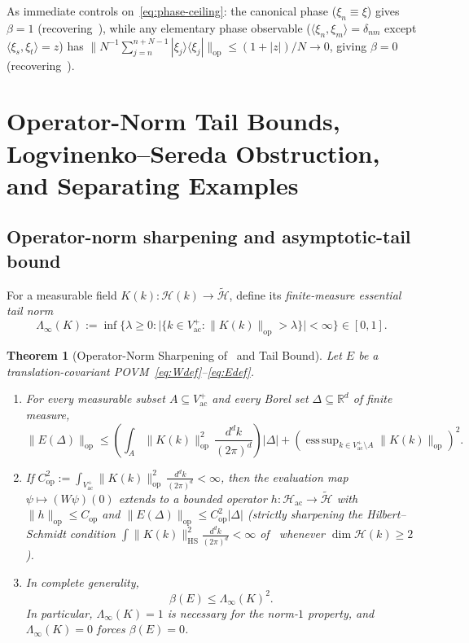 \documentclass[11pt,a4paper]{article}
\newtheorem{theorem}{Theorem}[section]
\theoremstyle{definition}
\theoremstyle{remark}
\newcommand{\HH}{\mathcal{H}}
\newcommand{\tH}{\widetilde{\mathcal{H}}}
\newcommand{\RR}{\mathbb{R}}
\newcommand{\op}{\mathrm{op}}
\newcommand{\HS}{\mathrm{HS}}
\newcommand{\ac}{\mathrm{ac}}
\newcommand{\ket}[1]{|#1\rangle}
\newcommand{\bra}[1]{\langle #1|}
\newcommand{\ip}[2]{\langle #1, #2 \rangle}
\newcommand{\norm}[1]{\|#1\|}
\DeclareMathOperator*{\esssup}{ess\,sup}
\begin{document}
As immediate controls on~\eqref{eq:phase-ceiling}: the canonical phase ($\xi_n\equiv\xi$) gives $\beta=1$ (recovering~\cite[Prop.~10]{Heinonen2003}), while any elementary phase observable ($\ip{\xi_n}{\xi_m}=\delta_{nm}$ except $\ip{\xi_s}{\xi_t}=z$) has $\norm{N^{-1}\sum_{j=n}^{n+N-1}\ket{\xi_j}\bra{\xi_j}}_{\op}\le (1+|z|)/N\to 0$, giving $\beta=0$ (recovering~\cite[Sec.~5.2]{Heinonen2003}).

\section{Operator-Norm Tail Bounds, Logvinenko--Sereda Obstruction, and Separating Examples}
\label{sec:obstructions}

\subsection{Operator-norm sharpening and asymptotic-tail bound}
For a measurable field $K(k):\HH(k)\to\tH$, define its \emph{finite-measure essential tail norm}
\begin{equation}\label{eq:lambda-inf}
\Lambda_\infty(K) := \inf\bigl\{\lambda\ge 0 : \bigl|\{k\in V_\ac^+ : \norm{K(k)}_{\op} > \lambda\}\bigr| < \infty\bigr\} \in [0,1].
\end{equation}

\begin{theorem}[Operator-Norm Sharpening of~\cite{FewsterLoveridge2026} and Tail Bound]\label{thm:op-tail}
Let $E$ be a translation-covariant POVM~\eqref{eq:Wdef}--\eqref{eq:Edef}.
\begin{enumerate}[label=\textup{(\roman*)},leftmargin=*]
\item For every measurable subset $A\subseteq V_\ac^+$ and every Borel set $\Delta\subseteq\RR^d$ of finite measure,
\begin{equation}\label{eq:tail-split}
\norm{E(\Delta)}_{\op} \le \left(\int_A \norm{K(k)}_{\op}^2\,\frac{d^dk}{(2\pi)^d}\right)|\Delta| + \left(\esssup_{k\in V_\ac^+\setminus A}\norm{K(k)}_{\op}\right)^2.
\end{equation}
\item If $C_{\op}^2 := \int_{V_\ac^+}\norm{K(k)}_{\op}^2\,\frac{d^dk}{(2\pi)^d}<\infty$, then the evaluation map $\psi\mapsto(W\psi)(0)$ extends to a bounded operator $h:\HH_\ac\to\tH$ with $\norm{h}_{\op}\le C_{\op}$ and $\norm{E(\Delta)}_{\op}\le C_{\op}^2|\Delta|$ (strictly sharpening the Hilbert--Schmidt condition $\int \norm{K(k)}_{\HS}^2\frac{d^dk}{(2\pi)^d}<\infty$ of~\cite[Cor.~2.8]{FewsterLoveridge2026} whenever $\dim\HH(k)\ge 2$).
\item In complete generality,
\begin{equation}\label{eq:beta-tail}
\beta(E) \le \Lambda_\infty(K)^2.
\end{equation}
In particular, $\Lambda_\infty(K)=1$ is necessary for the norm-$1$ property, and $\Lambda_\infty(K)=0$ forces $\beta(E)=0$.
\end{enumerate}
\end{theorem}
\end{document}
